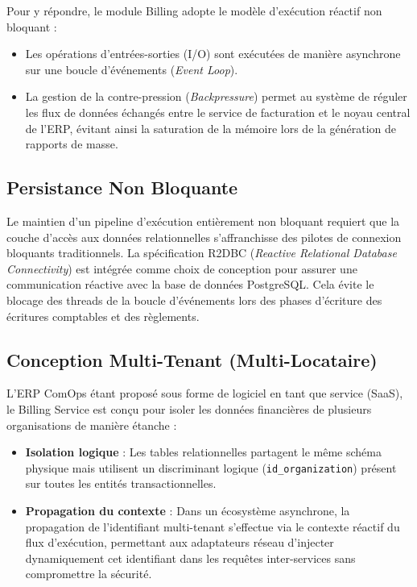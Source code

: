 Pour y répondre, le module Billing adopte le modèle d'exécution réactif non bloquant :
\begin{itemize}
    \item Les opérations d'entrées-sorties (I/O) sont exécutées de manière asynchrone sur une boucle d'événements (\textit{Event Loop}).
    \item La gestion de la contre-pression (\textit{Backpressure}) permet au système de réguler les flux de données échangés entre le service de facturation et le noyau central de l'ERP, évitant ainsi la saturation de la mémoire lors de la génération de rapports de masse.
\end{itemize}

\subsection{Persistance Non Bloquante}
Le maintien d'un pipeline d'exécution entièrement non bloquant requiert que la couche d'accès aux données relationnelles s'affranchisse des pilotes de connexion bloquants traditionnels. La spécification R2DBC (\textit{Reactive Relational Database Connectivity}) est intégrée comme choix de conception pour assurer une communication réactive avec la base de données PostgreSQL. Cela évite le blocage des threads de la boucle d'événements lors des phases d'écriture des écritures comptables et des règlements.

\subsection{Conception Multi-Tenant (Multi-Locataire)}
L'ERP ComOps étant proposé sous forme de logiciel en tant que service (SaaS), le Billing Service est conçu pour isoler les données financières de plusieurs organisations de manière étanche :
\begin{itemize}
    \item \textbf{Isolation logique} : Les tables relationnelles partagent le même schéma physique mais utilisent un discriminant logique (\texttt{id\_organization}) présent sur toutes les entités transactionnelles.
    \item \textbf{Propagation du contexte} : Dans un écosystème asynchrone, la propagation de l'identifiant multi-tenant s'effectue via le contexte réactif du flux d'exécution, permettant aux adaptateurs réseau d'injecter dynamiquement cet identifiant dans les requêtes inter-services sans compromettre la sécurité.
\end{itemize}

